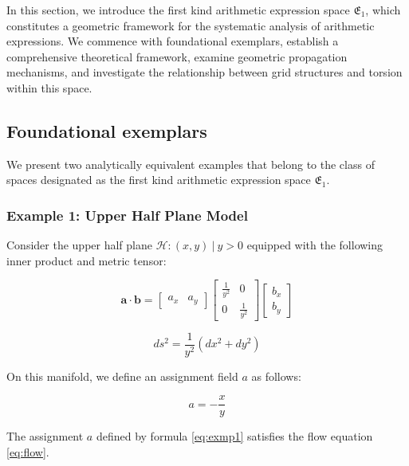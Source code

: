 In this section, we introduce the first kind arithmetic expression space $\mathfrak{E}_1$, which constitutes a geometric framework for the systematic analysis of arithmetic expressions. We commence with foundational exemplars, establish a comprehensive theoretical framework, examine geometric propagation mechanisms, and investigate the relationship between grid structures and torsion within this space.

\subsection{Foundational exemplars}\label{subsec:motivexamples}

We present two analytically equivalent examples that belong to the class of spaces designated as the first kind arithmetic expression space $\mathfrak{E}_1$.

\subsubsection{Example 1: Upper Half Plane Model}

Consider the upper half plane ${\mathcal{H}: (x, y) \ | \ y > 0}$ equipped with the following inner product and metric tensor:

$$
\mathbf{a} \cdot \mathbf{b} = \begin{bmatrix} a_x & a_y \end{bmatrix} \begin{bmatrix} \frac{1}{y^2} & 0 \\ 0 & \frac{1}{y^2} \end{bmatrix} \begin{bmatrix} b_x \\ b_y \end{bmatrix}
$$

$$
ds^2 = \frac{1}{y^2} (dx^2 + dy^2)
$$

On this manifold, we define an assignment field $a$ as follows:

\begin{equation}\label{eq:exmp1}
a = - \frac{x}{y}
\end{equation}

\begin{theorem}\label{thm:exmp1}
The assignment $a$ defined by formula \eqref{eq:exmp1} satisfies the flow equation \eqref{eq:flow}.
\end{theorem}

